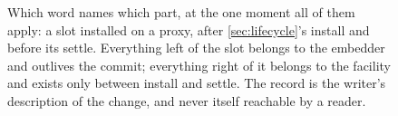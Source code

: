 \begin{figure}[tb]
\caption{Which word names which part, at the one moment all of them
apply: a slot installed on a proxy, after \cref{sec:lifecycle}'s install and
before its settle. Everything left of the slot belongs to the embedder and
outlives the commit; everything right of it belongs to the facility and exists
only between install and settle. The record is the writer's description of the
change, and never itself reachable by a reader.}
\label{fig:anatomy}
\end{figure}
